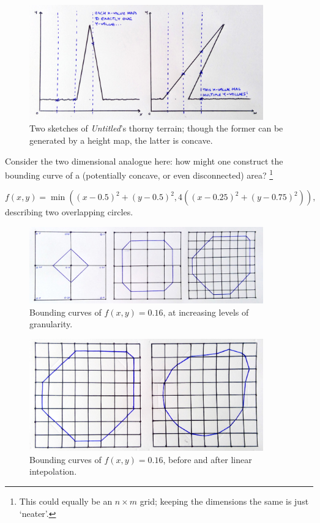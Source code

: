 \documentclass[a4paper, 11pt]{article}
\begin{document}
\begin{flushleft}
\begin{figure}[h]
\centering
\includegraphics[width=0.9\textwidth]{Concave Terrain}
\caption{Two sketches of \textit{Untitled}'s thorny terrain; though the former can be generated by a height map, the latter is concave.}
\label{Concave Terrain}
\end{figure}

\vspace{5pt}\noindent
Consider the two dimensional analogue here: how might one construct the bounding curve of a (potentially concave, or even disconnected) area? \footnote{This could equally be an $n \times m$ grid; keeping the dimensions the same is just `neater'.}

$$f(x,y) = \min\left(\left(x-0.5\right)^2+\left(y-0.5\right)^2,4\left(\left(x-0.25\right)^2+\left(y-0.75\right)^2\right)\right),$$
describing two overlapping circles.

\begin{figure}[h]
\centering
\includegraphics[width=0.9\textwidth]{Marching Squares}
\caption{Bounding curves of $f(x,y) = 0.16$, at increasing levels of granularity.}
\label{Marching Squares}
\end{figure}

\vspace{5pt}

\begin{figure}[h]
\centering
\includegraphics[width=0.9\textwidth]{Interpolated Marching Squares}
\caption{Bounding curves of $f(x,y) = 0.16$, before and after linear intepolation.}
\label{Interpolated Marching Squares}
\end{figure}


\end{flushleft}
\end{document}
